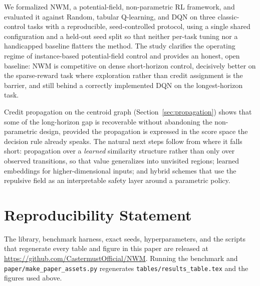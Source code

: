 \documentclass[11pt]{article}
\newcommand{\NWM}{\textsc{NWM}}
\begin{document}
We formalized \NWM{}, a potential-field, non-parametric RL framework, and
evaluated it against Random, tabular Q-learning, and DQN on three
classic-control tasks with a reproducible, seed-controlled protocol, using a
single shared configuration and a held-out seed split so that neither
per-task tuning nor a handicapped baseline flatters the method. The study
clarifies the operating regime of instance-based potential-field control and
provides an honest, open baseline: \NWM{} is competitive on dense short-horizon
control, decisively better on the sparse-reward task where exploration rather
than credit assignment is the barrier, and still behind a correctly implemented
DQN on the longest-horizon task.

Credit propagation on the centroid graph (Section~\ref{sec:propagation}) shows
that some of the long-horizon gap is recoverable without abandoning the
non-parametric design, provided the propagation is expressed in the score space
the decision rule already speaks. The natural next steps follow from where it
falls short: propagation over a \emph{learned} similarity structure rather than
only over observed transitions, so that value generalizes into unvisited
regions; learned embeddings for higher-dimensional inputs; and hybrid schemes
that use the repulsive field as an interpretable safety layer around a
parametric policy.

\section*{Reproducibility Statement}
The library, benchmark harness, exact seeds, hyperparameters, and the scripts
that regenerate every table and figure in this paper are released at
\url{https://github.com/CastermustOfficial/NWM}. Running the benchmark and
\texttt{paper/make\_paper\_assets.py} regenerates
\texttt{tables/results\_table.tex} and the figures used above.



\end{document}
